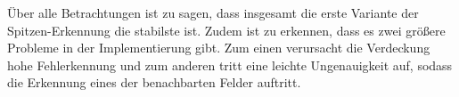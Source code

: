 Über alle Betrachtungen ist zu sagen, dass insgesamt die erste Variante der Spitzen-Erkennung die stabilste ist. Zudem ist zu erkennen, dass es zwei größere Probleme in der Implementierung gibt. Zum einen verursacht die Verdeckung hohe Fehlerkennung und zum anderen tritt eine leichte Ungenauigkeit auf, sodass die Erkennung eines der benachbarten Felder auftritt.


